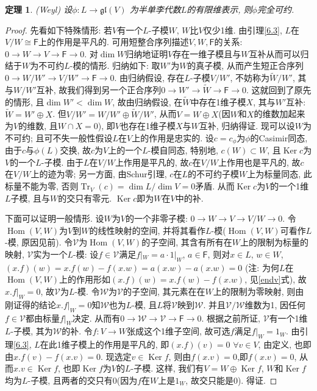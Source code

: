 \documentclass{ctexart}%
\newtheorem{theorem}{定理}
\theoremstyle{definition}
\theoremstyle{remark}
\DeclareMathOperator{\Tr}{Tr}
\DeclareMathOperator{\Hom}{Hom}
\DeclareMathOperator{\Ker}{Ker}
\begin{document}
\begin{theorem}\label{weyl}
(Weyl) 设$\phi\colon L\rightarrow \mathfrak{gl}(V)$ 为半单李代数$L$的有限维表示, 则$\phi$完全可约.
\end{theorem}
\begin{proof}
先看如下特殊情形: 若$V$有一个$L$-子模$W$, $W$比$V$仅少1维. 由引理\ref{6.3}, $L$在$V/W\cong \mathsf{F}$上的作用是平凡的. 可用短整合序列描述$V,W,\mathsf{F}$的关系: $0\rightarrow W\rightarrow V\rightarrow \mathsf{F}\rightarrow 0$. 对$\dim W$归纳地证明$V$存在一维子模且与$W$互补从而可以归结于$W$为不可约$L$-模的情形. 归纳如下: 取$W'$为$W$的真子模, 从而产生短正合序列$0\rightarrow W/W'\rightarrow V/W'\rightarrow \mathsf{F}\rightarrow 0$. 由归纳假设, 存在$L$-子模$V/W'$, 不妨称为$\widetilde{W}/W'$, 其与$W/W'$互补, 故我们得到另一个正合序列$0\rightarrow W'\rightarrow \widetilde{W}\rightarrow \mathsf{F}\rightarrow 0$. 这就回到了原先的情形, 且$\dim W'<\dim W$, 故由归纳假设, 在$\widetilde{W}$中存在1维子模$X$, 其与$W'$互补: $\widetilde{W}=W'\oplus X$. 但$V/W'=W/W'\oplus \widetilde{W}/W'$, 从而$V=W\oplus X$(因$W$和$X$的维数加起来为$V$的维数, 且$W\cap X=0$), 即$V$也存在1维子模$X$与$W$互补, 归纳得证. 现可以设$W$为不可约; 且可不失一般性假设$L$在$V$上的作用是忠实的. 设$c=c_\phi$为$\phi$的Casimir同态, 由于$c$与$\phi(L)$交换, 故$c$为$V$上的一个$L$-模自同态, 特别地, $c(W)\subset W$, 且$\Ker c$为$V$的一个$L$-子模. 由于$L$在$V/W$上作用是平凡的, 故$c$在$V/W$上作用也是平凡的, 故$c$在$V/W$上的迹为零; 另一方面, 由Schur引理, $c$在$L$的不可约子模$W$上为标量同态, 此标量不能为零, 否则$\Tr_V(c)=\dim L/\dim V=0$矛盾. 从而$\Ker c$为$V$的一个1维$L$子模, 且与$W$的交只有零元. $\Ker c$即为$W$在$V$中的补. 

下面可以证明一般情形. 设$W$为$V$的一个非零子模: $0\rightarrow W\rightarrow V\rightarrow V/W\rightarrow 0$. 令$\Hom(V,W)$为$V$到$W$的线性映射的空间, 并将其看作$L$-模($\Hom(V,W)$可看作$L$-模, 原因见前). 令$\mathscr{V}$为$\Hom(V,W)$的子空间, 其含有所有在$W$上的限制为标量的映射, $\mathscr{V}$实为一个$L$-模: 设$f\in \mathscr{V}$满足$f|_W=a\cdot1|_W$, $a\in\mathsf{F}$, 则对$x\in L$, $w\in W$, $(x.f)(w)=x.f(w)-f(x.w) = a(x.w)-a(x.w) = 0$ (注: 为何$L$在$\Hom(V,W)$上的作用形如$(x.f)(w)=x.f(w)-f(x.w)$, 见\eqref{endv}式), 故$x.f|_W=0$, 故$\mathscr{V}$为$L$-模. 令$\mathscr{W}$为$\mathscr{V}$的子空间, 其元素在在$W$上的限制为零映射, 则由刚证得的结论$x.f|_W=0$知$\mathscr{W}$也为$L$-模,  且$L$将$\mathscr{V}$映到$\mathscr{W}$. 并且$\mathscr{V}/\mathscr{W}$维数为1, 因任何$f\in \mathscr{V}$都由标量$f|_W$决定. 从而有$0\rightarrow \mathscr{W}\rightarrow \mathscr{V}\rightarrow \mathsf{F}\rightarrow 0$. 根据之前所证, $\mathscr{V}$有一个1维$L$-子模, 其为$\mathscr{W}$的补. 令$f\colon V\rightarrow W$张成这个1维子空间, 故可选$f$满足$f|_W=1_W$. 由引理\ref{6.3}, $L$在此1维子模上的作用是平凡的, 即$(x.f)(v)=0$ $\forall v \in V$, 由定义, 也即由$x.f(v)-f(x.v)=0$. 现选定$v\in\Ker f$, 则由$f(x.v)=0$,即$f(x.v)=0$, 从而$x.v\in \Ker f$, 也即$\Ker f$为$V$的$L$-子模. 这样, 我们有$V=W\oplus \Ker f$,  $W$和$\Ker f$均为$L$-子模, 且两者的交只有0(因为$f$在$W$上是$1_W$, 故交只能是0). 得证.
\end{proof}
\end{document}
